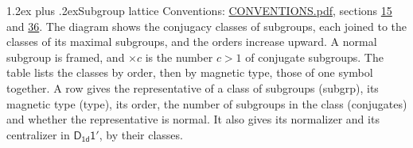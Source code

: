 \documentclass[10pt,a4paper]{article}
\makeatletter
\renewcommand\section{\@startsection{section}{1}{\z@}{-3ex plus -1ex minus -.2ex}%
  {1.2ex plus .2ex}{\normalfont\large\sffamily\bfseries\color{parttitle}}}
\numberwithin{equation}{section}
\newcommand{\grp}[1]{\mathsf{#1}}
\makeatother
\begin{document}
\section{Subgroup lattice}\label{s:subgroups}
Conventions: \href{../../CONVENTIONS.pdf}{CONVENTIONS.pdf}, sections \href{../../../rotation/CONVENTIONS.pdf\#conv.15}{15} and \href{../../CONVENTIONS.pdf\#conv.36}{36}.
The diagram shows the conjugacy classes of subgroups, each joined to the classes of its maximal subgroups, and the orders increase upward. \label{n:index.conjugates.c}A normal subgroup is framed, and ${\times}c$ is the number $c > 1$ of conjugate subgroups. The table lists the classes by order, then by magnetic type, those of one symbol together. \label{n:head.subgroup}\label{n:head.magnetic.type}\label{n:head.order}\label{n:head.conjugates}\label{n:head.normal}A row gives the representative of a class of subgroups (subgrp), its magnetic type (type), its order, the number of subgroups in the class (conjugates) and whether the representative is normal. \label{n:head.normalizer}\label{n:head.centralizer}It also gives its normalizer and its centralizer in $\grp{D_{1d}1'}$, by their classes. 
\end{document}
